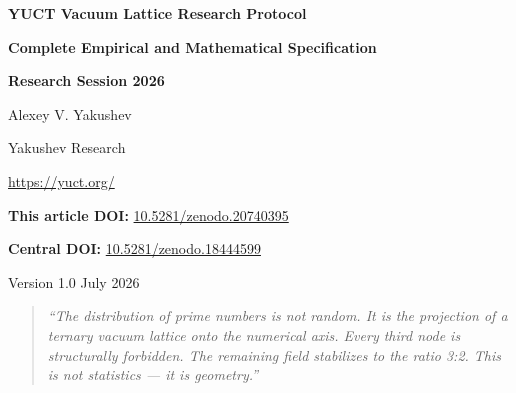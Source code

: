\documentclass[12pt,a4paper]{article}
\begin{document}
	
	\begin{titlepage}
		\begin{center}
			\vspace*{1cm}
			{\Huge\bfseries\color{darkblue} YUCT Vacuum Lattice Research Protocol\par}
			\vspace{0.3cm}
			{\Large\bfseries Complete Empirical and Mathematical Specification\par}
			\vspace{0.5cm}
			{\large\bfseries Research Session 2026\par}
			\vspace{1.5cm}
			{\large Alexey V. Yakushev\par}
			{\large Yakushev Research\par}
			{\large \url{https://yuct.org/}\par}
			
			\vspace{1cm}
			{\large \textbf{This article DOI:} \href{https://doi.org/10.5281/zenodo.20740395}{10.5281/zenodo.20740395}\par}
			
			\vspace{1cm}
			{\large \textbf{Central DOI:} \href{https://doi.org/10.5281/zenodo.18444599}{10.5281/zenodo.18444599}\par}
			\vspace{1cm}
			{\large Version 1.0 \quad July 2026\par}
			\vfill
			\begin{quote}
				\itshape
				``The distribution of prime numbers is not random. It is the projection of a ternary vacuum lattice onto the numerical axis. Every third node is structurally forbidden. The remaining field stabilizes to the ratio 3:2. This is not statistics — it is geometry.''
			\end{quote}
			\vspace{0.5cm}
			\begin{center}
			\end{center}
		\end{center}
	\end{titlepage}
	
\end{document}
